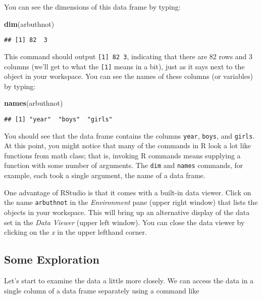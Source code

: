 \documentclass[
]{article}
\newenvironment{Shaded}{\begin{snugshade}}{\end{snugshade}}
\newcommand{\KeywordTok}[1]{\textcolor[rgb]{0.13,0.29,0.53}{\textbf{#1}}}
\newcommand{\NormalTok}[1]{#1}
\begin{document}
You can see the dimensions of this data frame by typing:

\begin{Shaded}
\begin{Highlighting}[]
\KeywordTok{dim}\NormalTok{(arbuthnot)}
\end{Highlighting}
\end{Shaded}

\begin{verbatim}
## [1] 82  3
\end{verbatim}

This command should output \texttt{{[}1{]}\ 82\ 3}, indicating that
there are 82 rows and 3 columns (we'll get to what the \texttt{{[}1{]}}
means in a bit), just as it says next to the object in your workspace.
You can see the names of these columns (or variables) by typing:

\begin{Shaded}
\begin{Highlighting}[]
\KeywordTok{names}\NormalTok{(arbuthnot)}
\end{Highlighting}
\end{Shaded}

\begin{verbatim}
## [1] "year"  "boys"  "girls"
\end{verbatim}

You should see that the data frame contains the columns \texttt{year},
\texttt{boys}, and \texttt{girls}. At this point, you might notice that
many of the commands in R look a lot like functions from math class;
that is, invoking R commands means supplying a function with some number
of arguments. The \texttt{dim} and \texttt{names} commands, for example,
each took a single argument, the name of a data frame.

One advantage of RStudio is that it comes with a built-in data viewer.
Click on the name \texttt{arbuthnot} in the \emph{Environment} pane
(upper right window) that lists the objects in your workspace. This will
bring up an alternative display of the data set in the \emph{Data
Viewer} (upper left window). You can close the data viewer by clicking
on the \emph{x} in the upper lefthand corner.

\hypertarget{some-exploration}{%
\subsection{Some Exploration}\label{some-exploration}}

Let's start to examine the data a little more closely. We can access the
data in a single column of a data frame separately using a command like
\end{document}
